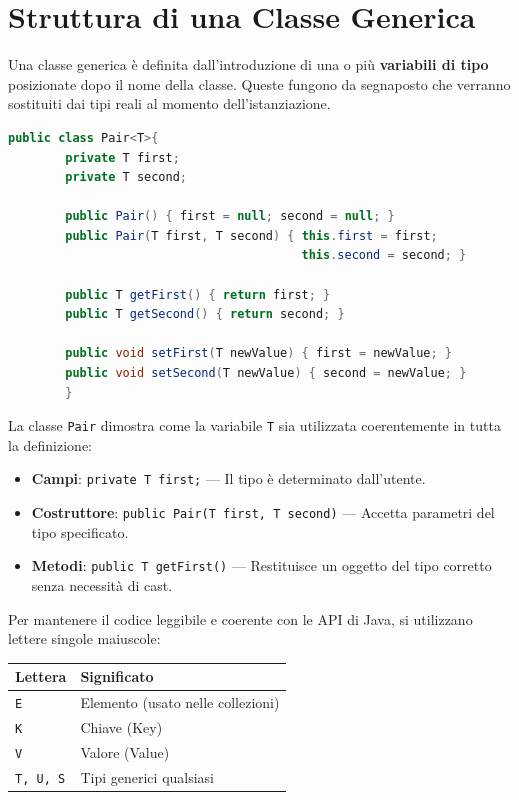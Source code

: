 \section{Struttura di una Classe Generica}

Una classe generica è definita dall'introduzione di una o più \textbf{variabili di tipo} posizionate dopo il nome della classe. Queste fungono da segnaposto che verranno sostituiti dai tipi reali al momento dell'istanziazione.

\begin{lstlisting}[language=Java, caption={Esempio: la classe \texttt{Pair}}]
    public class Pair<T>{
        private T first;
        private T second;

        public Pair() { first = null; second = null; }
        public Pair(T first, T second) { this.first = first; 
                                         this.second = second; }

        public T getFirst() { return first; }
        public T getSecond() { return second; }

        public void setFirst(T newValue) { first = newValue; }
        public void setSecond(T newValue) { second = newValue; }
        }
\end{lstlisting}

La classe \texttt{Pair} dimostra come la variabile \texttt{T} sia utilizzata coerentemente in tutta la definizione:

\begin{itemize}
    \item \textbf{Campi}: \texttt{private T first;} --- Il tipo è determinato dall'utente.
    \item \textbf{Costruttore}: \texttt{public Pair(T first, T second)} --- Accetta parametri del tipo specificato.
    \item \textbf{Metodi}: \texttt{public T getFirst()} --- Restituisce un oggetto del tipo corretto senza necessità di cast.
\end{itemize}
\medskip
Per mantenere il codice leggibile e coerente con le API di Java, si utilizzano lettere singole maiuscole:
\begin{table}[ht]
\centering
\begin{tabular}{ll}
\hline
\textbf{Lettera} & \textbf{Significato} \\ \hline
\texttt{E} & Elemento (usato nelle collezioni) \\
\texttt{K} & Chiave (Key) \\
\texttt{V} & Valore (Value) \\
\texttt{T, U, S} & Tipi generici qualsiasi \\ \hline
\end{tabular}
\end{table}

